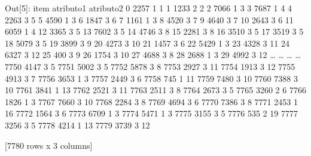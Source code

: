 \begin{Highligth}[commandchars=\\\{\}]
{\color{outcolor}Out[{\color{outcolor}5}]:}       item  atributo1  atributo2
        0     2257          1          1
        1     1233          2          2
        2     7066          1          3
        3     7687          1          4
        4     2263          3          5
        5     4590          1          3
        6     1847          3          6
        7     1161          1          3
        8     4520          3          7
        9     4640          3          7
        10    2643          3          6
        11    6059          1          4
        12    3365          3          5
        13    7602          3          5
        14    4746          3          8
        15    2281          3          8
        16    3510          3          5
        17    3519          3          5
        18    5079          3          5
        19    3899          3          9
        20    4273          3         10
        21    1457          3          6
        22    5429          1          3
        23    4328          3         11
        24    6327          3         12
        25     400          3          9
        26    1754          3         10
        27    4688          3          8
        28    2688          1          3
        29    4992          3         12
        {\ldots}    {\ldots}        {\ldots}        {\ldots}
        7750  4147          3          5
        7751  5002          3          5
        7752  5878          3          8
        7753  2927          3         11
        7754  1913          3         12
        7755  4913          3          7
        7756  3653          1          3
        7757  2449          3          6
        7758   745          1         11
        7759  7480          3         10
        7760  7388          3         10
        7761  3841          1         13
        7762  2521          3         11
        7763  2511          3          8
        7764  2673          3          5
        7765  3260          2          6
        7766  1826          1          3
        7767  7660          3         10
        7768  2284          3          8
        7769  4694          3          6
        7770  7386          3          8
        7771  2453          1         16
        7772  1564          3          6
        7773  6709          1          3
        7774  5471          1          3
        7775  3155          3          5
        7776   535          2         19
        7777  3256          3          5
        7778  4214          1         13
        7779  3739          3         12
        
        [7780 rows x 3 columns]
\end{Highligth}
            
